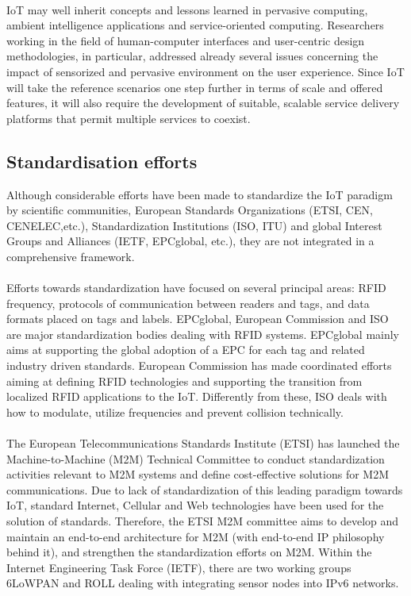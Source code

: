 \documentclass[10pt, twocolumn]{article}
\begin{document}
\paragraph{}
IoT may well inherit concepts and lessons learned in pervasive computing, ambient intelligence applications and service-oriented computing. Researchers working in the field of human-computer interfaces and user-centric design methodologies, in particular, addressed already several issues concerning the impact of sensorized and pervasive environment on the user experience. Since IoT will take the reference scenarios one step further in terms of scale and offered features, it will also require the development of suitable, scalable service delivery platforms that permit multiple services to coexist.
\subsection{Standardisation efforts}
Although considerable efforts have been made to standardize the IoT paradigm by scientific communities, European Standards
Organizations (ETSI, CEN, CENELEC,etc.), Standardization Institutions (ISO, ITU) and global Interest Groups and Alliances (IETF, EPCglobal, etc.), they are not integrated in a comprehensive framework.
\paragraph{}
Efforts towards standardization have focused on several principal areas: RFID frequency, protocols of communication between readers and tags, and data formats placed on tags and labels. EPCglobal, European Commission and ISO are major standardization bodies dealing with RFID systems. EPCglobal mainly aims at supporting the global adoption of a EPC for each tag and related industry driven standards. European Commission has made coordinated efforts aiming at defining RFID technologies and supporting the transition from localized RFID applications to the IoT. Differently from these, ISO deals with how to modulate, utilize frequencies and prevent collision technically.
\paragraph{}
The European Telecommunications Standards Institute (ETSI) has launched the Machine-to-Machine (M2M) Technical Committee to conduct standardization activities relevant to M2M systems and define cost-effective solutions for M2M communications. Due to lack of standardization of this leading paradigm towards IoT, standard Internet, Cellular and Web technologies have been used for the solution of standards. Therefore, the ETSI M2M committee aims to develop and maintain an end-to-end architecture for M2M (with end-to-end IP philosophy behind it), and strengthen the standardization efforts on M2M. Within the Internet Engineering
Task Force (IETF), there are two working groups 6LoWPAN and ROLL dealing with integrating sensor nodes into IPv6 networks.
\end{document}
